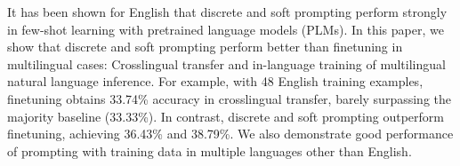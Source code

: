 It has been shown for English that discrete and soft prompting  perform strongly in few-shot learning with pretrained language models (PLMs). In this paper, we show that discrete and soft prompting perform better than finetuning in multilingual cases: Crosslingual transfer and in-language training of multilingual natural language inference. For example, with 48 English training examples, finetuning obtains 33.74\% accuracy in crosslingual transfer, barely surpassing the majority baseline (33.33\%). In contrast, discrete and soft prompting outperform finetuning, achieving 36.43\% and 38.79\%. We also demonstrate good performance of prompting with training data in multiple languages other than English.
